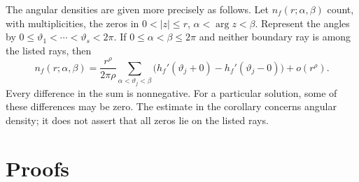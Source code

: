 \documentclass[a4paper,12pt]{article}
\numberwithin{equation}{section}
\begin{document}
The angular densities are given more precisely as follows.
Let $n_f(r;\alpha,\beta)$ count, with multiplicities, the zeros in
$0<|z|\le r$, $\alpha<\arg z<\beta$.
Represent the angles by $0\le\vartheta_1<\cdots<\vartheta_s<2\pi$.
If $0\le\alpha<\beta\le2\pi$ and neither boundary ray is among the
listed rays, then
\begin{equation}\label{eq.zero.angular.density}
 n_f(r;\alpha,\beta)
 =\frac{r^\rho}{2\pi\rho}
   \sum_{\alpha<\vartheta_j<\beta}
   \bigl(h_f'(\vartheta_j+0)-h_f'(\vartheta_j-0)\bigr)
   +o(r^\rho).
\end{equation}
Every difference in the sum is nonnegative.
For a particular solution, some of these differences may be zero.
The estimate in the corollary concerns angular density; it does not
assert that all zeros lie on the listed rays.

\section{Proofs}\label{Sec.proof}
\end{document}
